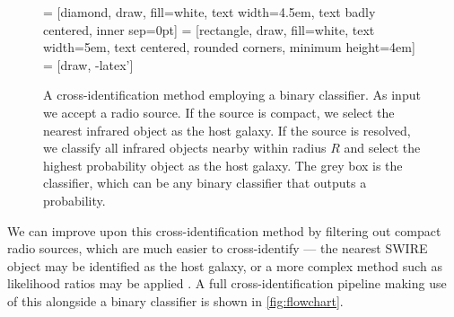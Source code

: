 \documentclass[fleqn,usenatbib,usedcolumn]{mnras}
\begin{document}
    \begin{figure}
      \centering
       = [diamond, draw, fill=white,
          text width=4.5em, text badly centered, inner sep=0pt]
       = [rectangle, draw, fill=white,
          text width=5em, text centered, rounded corners, minimum height=4em]
       = [draw, -latex']
      \caption{A cross-identification method employing a binary classifier. As
        input we accept a radio source. If the source is compact, we select
        the nearest infrared object as the host galaxy. If the source is
        resolved, we classify all infrared objects nearby within radius $R$
        and select the highest probability object as the host galaxy. The grey
        box is the classifier, which can be any binary classifier that outputs
        a probability.}
      \label{fig:flowchart}
    \end{figure}

    We can improve upon this cross-identification method by filtering out
    compact radio sources, which are much easier to cross-identify --- the
    nearest SWIRE object may be identified as the host galaxy, or a more
    complex method such as likelihood ratios may be applied
    \citep[see][]{weston17}. A full cross-identification pipeline making use
    of this alongside a binary classifier is shown in \autoref{fig:flowchart}.
\end{document}

